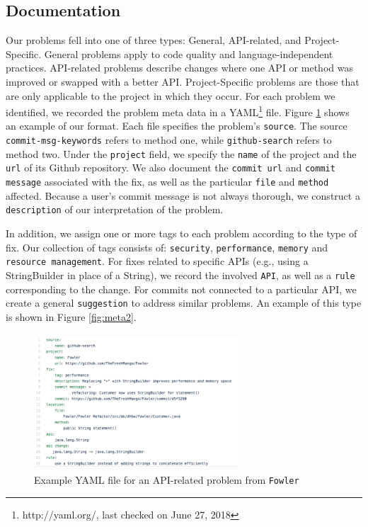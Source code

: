 \documentclass[sigconf]{acmart}
\begin{document}
\subsection{Documentation} 
Our problems fell into one of three types: General, API-related, and Project-Specific. General problems apply to code quality and language-independent practices. API-related problems describe changes where one API or method was improved or swapped with a better API. Project-Specific problems are those that are only applicable to the project in which they occur.
For each problem we identified, we recorded the problem meta data in a YAML\footnote{http://yaml.org/, last checked on June 27, 2018} file. Figure \ref{fig:meta1} shows an example of our format. Each file specifies the problem's \texttt{source}. The source \texttt{commit-msg-keywords} refers to method one, while \texttt{github-search} refers to method two. Under the \texttt{project} field, we specify the \texttt{name} of the project and the \texttt{url} of its Github repository. We also document the \texttt{commit url} and \texttt{commit message} associated with the fix, as well as the particular \texttt{file} and \texttt{method} affected. Because a user's commit message is not always thorough, we construct a \texttt{description} of our interpretation of the problem.

In addition, we assign one or more tags to each problem according to the type of fix. Our collection of tags consists of: \texttt{security}, \texttt{performance}, \texttt{memory}  and \texttt{resource management}. For fixes related to specific APIs (e.g., using a StringBuilder in place of  a String), we record the involved \texttt{API}, as well as a \texttt{rule} corresponding to the change. For commits not connected to a particular API, we create a general \texttt{suggestion} to address similar problems. An example of this type is shown in Figure \ref{fig:meta2}. 

\begin{figure}
  \includegraphics[height=2in, width=3in]{YAMLmetadata}
  \caption{Example YAML file for an API-related problem from \texttt{Fowler}}
  \label{fig:meta1}
\end{figure}
\end{document}
